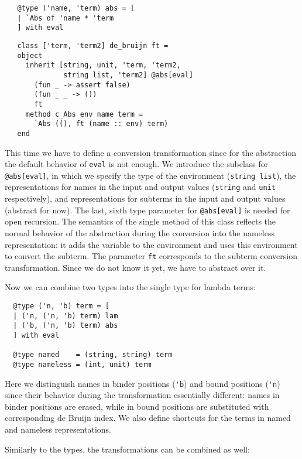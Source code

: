 \begin{lstlisting}
   @type ('name, 'term) abs = [
   | `Abs of 'name * 'term
   ] with eval
\end{lstlisting}
 
\begin{lstlisting}
   class ['term, 'term2] de_bruijn ft =
   object
     inherit [string, unit, 'term, 'term2,
              string list, 'term2] @abs[eval]
       (fun _ -> assert false)
       (fun _ _ -> ())
       ft
     method c_Abs env name term =
       `Abs ((), ft (name :: env) term)
   end
\end{lstlisting}

This time we have to define a conversion transformation since for the abstraction the default behavior of \lstinline{eval} is not
enough. We introduce the subclass for \lstinline{@abs[eval]}, in which we specify the type of the environment (\lstinline{string list}),
the representations for names in the input and output values (\lstinline{string} and \lstinline{unit} respectively), and
representations for subterms in the input and output values (abstract for now). The last, sixth type parameter for \lstinline{@abs[eval]}
is needed for open recursion. The semantics of the single method of this class reflects the normal behavior of the
abstraction during the conversion into the nameless representation: it adds the variable to the environment and uses this
environment to convert the subterm. The parameter \lstinline{ft} corresponds to the subterm conversion transformation. Since
we do not know it yet, we have to abstract over it.

Now we can combine two types into the single type for lambda terms:

\begin{lstlisting}
  @type ('n, 'b) term = [
  | ('n, ('n, 'b) term) lam
  | ('b, ('n, 'b) term) abs
  ] with eval

  @type named    = (string, string) term
  @type nameless = (int, unit) term
\end{lstlisting}

Here we distinguish names in binder positions (\lstinline{'b}) and bound positions (\lstinline{'n}) since their behavior during the
transformation essentially different: names in binder positions are erased, while in bound positions are substituted with corresponding
de Bruijn index. We also define shortcuts for the terms in named and nameless representations.

Similarly to the types, the transformations can be combined as well:

